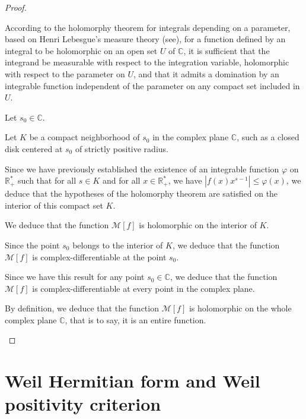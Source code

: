 \documentclass[Riemann_Hypothesis.tex]{subfiles}
\begin{document}
\begin{proof}
    \begin{part_proof}
        According to the holomorphy theorem for integrals depending on a parameter, 
        based on Henri Lebesgue's measure theory (see\cite{lebesgue1902_these_en}), for a function defined by an integral to be holomorphic on an open set $U$ of $\mathbb{C}$, it is sufficient that the integrand be measurable with respect to the integration variable, holomorphic with respect to the parameter on $U$, and that it admits a domination by an integrable function independent of the parameter on any compact set included in $U$. \par
        Let $s_0 \in \mathbb{C}$. \par
        Let $K$ be a compact neighborhood of $s_0$ in the complex plane $\mathbb{C}$, such as a closed disk centered at $s_0$ of strictly positive radius. \par
        Since we have previously established the existence of an integrable function $\varphi$ on $\mathbb{R}_+^*$ such that for all $s \in K$ and for all $x \in \mathbb{R}_+^*$, we have $\left| f(x) x^{s-1} \right| \leq \varphi(x)$, we deduce that the hypotheses of the holomorphy theorem are satisfied on the interior of this compact set $K$. \par
        We deduce that the function $\mathcal{M}[f]$ is holomorphic on the interior of $K$. \par
        Since the point $s_0$ belongs to the interior of $K$, we deduce that the function $\mathcal{M}[f]$ is complex-differentiable at the point $s_0$. \par
        Since we have this result for any point $s_0 \in \mathbb{C}$, we deduce that the function $\mathcal{M}[f]$ is complex-differentiable at every point in the complex plane. \par
        By definition, we deduce that the function $\mathcal{M}[f]$ is holomorphic on the whole complex plane $\mathbb{C}$, that is to say, it is an entire function.
    \end{part_proof}

\end{proof}

\color{red}
\section{Weil Hermitian form and Weil positivity criterion}
\color{black}
\end{document}
